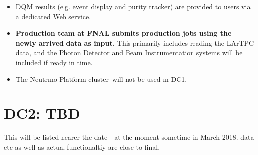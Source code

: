 \documentclass[pdftex,12pt,letter]{article}
\newcommand{\pd}{protoDUNE\xspace}
\begin{document}
\begin{itemize}
\item DQM results (e.g. event display and purity tracker) are provided to users via a dedicated Web service.

\item \textbf{Production team at FNAL submits production jobs using the newly arrived data as input.}
This primarily includes reading the LArTPC data, and the Photon Detector and Beam Instrumentation
systems will be included if ready in time.

\item The Neutrino Platform cluster\,\cite{neut} will not be used in DC1.

\end{itemize}

\clearpage

\section{DC2: TBD}
This will be listed nearer the date - at the moment sometime in March 2018.
data etc as well as actual functionaltiy are close to final.
\end{document}
